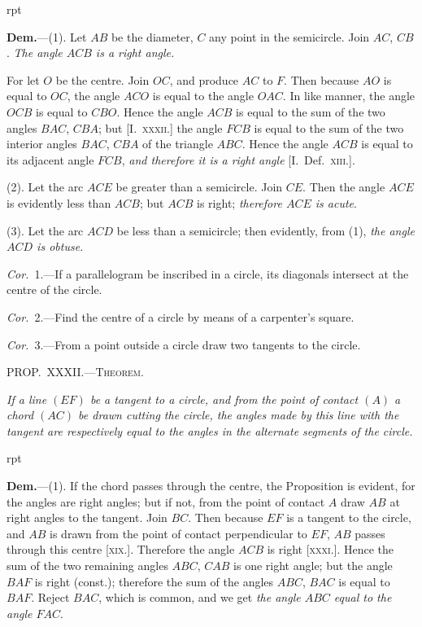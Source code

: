 \documentclass[oneside]{book}
\newcounter{wrapwidth}
\newcommand\mypropl[2]{
\bigskip\Needspace*{4\baselineskip}\begin{center}\textsc{#1}\end{center}
\hspace{\parindent}\emph{#2}\par\medskip
}
\newcommand\imgflow[3]{
\setcounter{wrapwidth}{#1}

\begin{wrapfigure}[#2]{r}{\value{wrapwidth}pt}
\begin{center}
\vspace{-0.3in}

\end{center}
\end{wrapfigure}
}
\begin{document}
\imgflow{140}{13}{f137}

\textbf{Dem.}---(1). Let $AB$ be the diameter, $C$ any point in
the semicircle. Join $AC$, $CB$.
\textit{The angle $ACB$ is a right angle.}

For let $O$ be the centre.
Join $OC$, and produce $AC$ to
$F$. Then because $AO$ is equal
to $OC$, the angle $ACO$ is equal
to the angle $OAC$. In like
manner, the angle $OCB$ is
equal to $CBO$. Hence the
angle $ACB$ is equal to the
sum of the two angles $BAC$,
$CBA$; but [I.\ \textsc{xxxii.}] the
angle $FCB$ is equal to the sum of the two interior
angles $BAC$, $CBA$ of the triangle $ABC$. Hence the
angle $ACB$ is equal to its adjacent angle $FCB$, \textit{and
therefore it is a right angle} [I.\ Def.\ \textsc{xiii.}].

(2). Let the arc $ACE$ be greater than a semicircle.
Join $CE$. Then the angle $ACE$ is evidently less than
$ACB$; but $ACB$ is right; \textit{therefore $ACE$ is acute}.



(3). Let the arc $ACD$ be less than a semicircle; then
evidently, from (1), \emph{the angle $ACD$ is obtuse.}

\emph{Cor.}~1.---If a parallelogram be inscribed in a circle,
its diagonals intersect at the centre of the circle.

\emph{Cor.}~2.---Find the centre of a circle by means of a
carpenter's square.

\emph{Cor.}~3.---From a point outside a circle draw two
tangents to the circle.

\mypropl{PROP\@.~XXXII\@.---Theorem.}{If a line $(EF)$ be a tangent to a circle, and from the
point of contact $(A)$ a chord $(AC)$ be drawn cutting the
circle, the angles made by this line with the tangent are
respectively equal to the angles in the alternate segments
of the circle.}


\imgflow{143}{11}{f138}

\textbf{Dem.}---(1). If the chord passes through the centre,
the Proposition is evident,
for the angles are right
angles; but if not, from the
point of contact $A$ draw $AB$
at right angles to the tangent.
Join $BC$. Then because $EF$
is a tangent to the circle,
and $AB$ is drawn from the
point of contact perpendicular
to $EF$, $AB$ passes through
this centre [\textsc{xix.}]. Therefore
the angle $ACB$ is right [\textsc{xxxi.}]. Hence the sum of the
two remaining angles $ABC$, $CAB$ is one right angle;
but the angle $BAF$ is right (const.); therefore the sum
of the angles $ABC$, $BAC$ is equal to $BAF$. Reject
$BAC$, which is common, and we get \emph{the angle $ABC$
equal to the angle $FAC$}.
\end{document}
